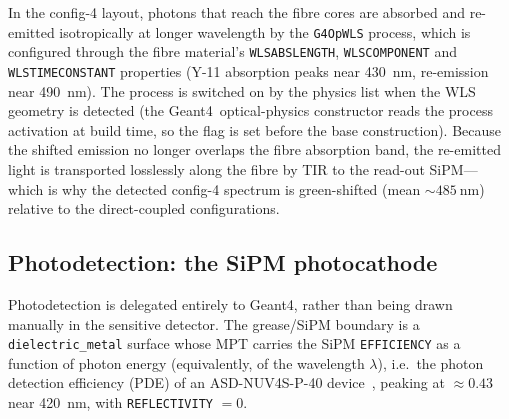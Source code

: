 \documentclass[11pt,a4paper]{article}
\newcommand{\gfour}{Geant4}
\begin{document}
In the config-4 layout, photons that reach the fibre cores are absorbed and
re-emitted isotropically at longer wavelength by the \texttt{G4OpWLS} process,
which is configured through the fibre material's \texttt{WLSABSLENGTH},
\texttt{WLSCOMPONENT} and \texttt{WLSTIMECONSTANT} properties (Y-11 absorption
peaks near \SI{430}{\nano\meter}, re-emission near \SI{490}{\nano\meter}). The
process is switched on by the physics list when the WLS geometry is detected (the
\gfour\ optical-physics constructor reads the process activation at build time,
so the flag is set before the base construction). Because the shifted emission no
longer overlaps the fibre absorption band, the re-emitted light is transported
losslessly along the fibre by TIR to the read-out SiPM---which is why the
detected config-4 spectrum is green-shifted (mean $\sim\!\SI{485}{\nano\meter}$)
relative to the direct-coupled configurations.

\subsection{Photodetection: the SiPM photocathode}

Photodetection is delegated entirely to \gfour, rather than being drawn
manually in the sensitive detector. The grease/SiPM boundary is a
\texttt{dielectric\_metal} surface whose MPT carries the SiPM
\texttt{EFFICIENCY} as a function of photon energy (equivalently, of the
wavelength $\lambda$), i.e.\ the photon detection
efficiency (PDE) of an ASD-NUV4S-P-40 device~\cite{AdvanSiD_NUV}, peaking at
$\approx 0.43$ near \SI{420}{\nano\meter}, with \texttt{REFLECTIVITY} $=0$.
\end{document}
